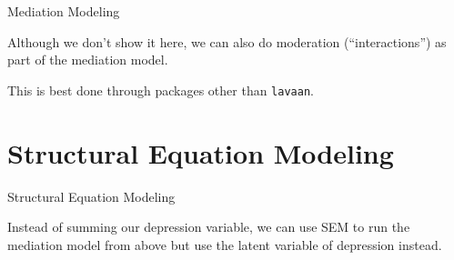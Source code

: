 \begin{frame}[fragile]{Mediation Modeling}

Although we don't show it here, we can also do moderation
(``interactions'') as part of the mediation model.

This is best done through packages other than \texttt{lavaan}.

\end{frame}

\section{Structural Equation
Modeling}\label{structural-equation-modeling}

\begin{frame}[fragile]{Structural Equation Modeling}

Instead of summing our depression variable, we can use SEM to run the
mediation model from above but use the latent variable of depression
instead. \footnotesize

\begin{Shaded}
\begin{Highlighting}[]

\StringTok{ }
\end{Highlighting}
\end{Shaded}

\end{frame}

